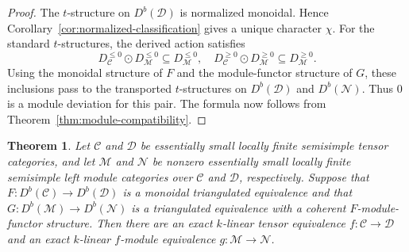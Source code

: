 \documentclass[11pt]{amsart}
\newcommand{\C}{\mathcal C}
\newcommand{\D}{\mathcal D}
\newcommand{\M}{\mathcal M}
\newcommand{\N}{\mathcal N}
\newtheorem{theorem}{Theorem}[section]
\theoremstyle{definition}
\theoremstyle{remark}
\theoremstyle{plain}
\begin{document}
\begin{proof}
The $t$-structure on $D^b(\D)$ is normalized monoidal. Hence Corollary~\ref{cor:normalized-classification} gives a unique character $\chi$. For the standard $t$-structures, the derived action satisfies
\[
D_{\C}^{\leq0}\odot D_{\M}^{\leq0}\subseteq D_{\M}^{\leq0},\quad D_{\C}^{\geq0}\odot D_{\M}^{\geq0}\subseteq D_{\M}^{\geq0}.
\]
Using the monoidal structure of $F$ and the module-functor structure of $G$, these inclusions pass to the transported $t$-structures on $D^b(\D)$ and $D^b(\N)$. Thus $0$ is a module deviation for this pair. The formula now follows from Theorem~\ref{thm:module-compatibility}.
\end{proof}

\begin{theorem}\label{thm:simultaneous-reconstruction}
Let $\C$ and $\D$ be essentially small locally finite semisimple tensor categories, and let $\M$ and $\N$ be nonzero essentially small locally finite semisimple left module categories over $\C$ and $\D$, respectively. Suppose that $F: D^b(\C)\to D^b(\D)$ is a monoidal triangulated equivalence and that $G: D^b(\M)\to D^b(\N)$ is a triangulated equivalence with a coherent $F$-module-functor structure. Then there are an exact $k$-linear tensor equivalence $f:\C\to\D$ and an exact $k$-linear $f$-module equivalence $g:\M\to\N$.
\end{theorem}
\end{document}
